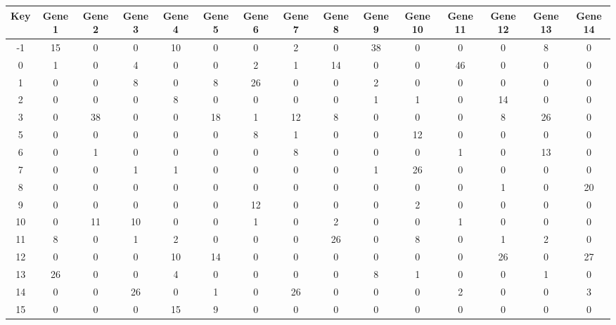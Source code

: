 \begin{tabular}{|c|c|c|c|c|c|c|c|c|c|c|c|c|c|c|}
\hline
Key & Gene 1 & Gene 2 & Gene 3 & Gene 4 & Gene 5 & Gene 6 & Gene 7 & Gene 8 & Gene 9 & Gene 10 & Gene 11 & Gene 12 & Gene 13 & Gene 14 \\
\hline
-1 & 15 & 0 & 0 & 10 & 0 & 0 & 2 & 0 & 38 & 0 & 0 & 0 & 8 & 0 \\
0 & 1 & 0 & 4 & 0 & 0 & 2 & 1 & 14 & 0 & 0 & 46 & 0 & 0 & 0 \\
1 & 0 & 0 & 8 & 0 & 8 & 26 & 0 & 0 & 2 & 0 & 0 & 0 & 0 & 0 \\
2 & 0 & 0 & 0 & 8 & 0 & 0 & 0 & 0 & 1 & 1 & 0 & 14 & 0 & 0 \\
3 & 0 & 38 & 0 & 0 & 18 & 1 & 12 & 8 & 0 & 0 & 0 & 8 & 26 & 0 \\
5 & 0 & 0 & 0 & 0 & 0 & 8 & 1 & 0 & 0 & 12 & 0 & 0 & 0 & 0 \\
6 & 0 & 1 & 0 & 0 & 0 & 0 & 8 & 0 & 0 & 0 & 1 & 0 & 13 & 0 \\
7 & 0 & 0 & 1 & 1 & 0 & 0 & 0 & 0 & 1 & 26 & 0 & 0 & 0 & 0 \\
8 & 0 & 0 & 0 & 0 & 0 & 0 & 0 & 0 & 0 & 0 & 0 & 1 & 0 & 20 \\
9 & 0 & 0 & 0 & 0 & 0 & 12 & 0 & 0 & 0 & 2 & 0 & 0 & 0 & 0 \\
10 & 0 & 11 & 10 & 0 & 0 & 1 & 0 & 2 & 0 & 0 & 1 & 0 & 0 & 0 \\
11 & 8 & 0 & 1 & 2 & 0 & 0 & 0 & 26 & 0 & 8 & 0 & 1 & 2 & 0 \\
12 & 0 & 0 & 0 & 10 & 14 & 0 & 0 & 0 & 0 & 0 & 0 & 26 & 0 & 27 \\
13 & 26 & 0 & 0 & 4 & 0 & 0 & 0 & 0 & 8 & 1 & 0 & 0 & 1 & 0 \\
14 & 0 & 0 & 26 & 0 & 1 & 0 & 26 & 0 & 0 & 0 & 2 & 0 & 0 & 3 \\
15 & 0 & 0 & 0 & 15 & 9 & 0 & 0 & 0 & 0 & 0 & 0 & 0 & 0 & 0 \\
\hline
\end{tabular}